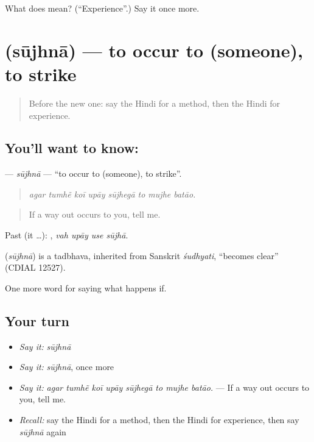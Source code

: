 \begin{tcolorbox}[breakable,colback=teal!4,colframe=teal!35!black,title={Before you move on}]
What does  mean? (\textquotedblleft{}Experience\textquotedblright{}.) Say it once more.
\end{tcolorbox}
\section[\texorpdfstring{\hi{सूझना} (sūjhnā)}{सूझना (sūjhnā)}]{ (sūjhnā) — to occur to (someone), to strike}

\label{lesson:HI-C392-sujhna}



\begin{quote}
Before the new one: say the Hindi for a method, then the Hindi for experience.
\end{quote}

\subsection*{You'll want to know: }
\textbf{} — \emph{sūjhnā} — \textquotedblleft{}to occur to (someone), to strike\textquotedblright{}.

\begin{quote}
       
\end{quote}

\begin{quote}
\emph{agar tumhẽ koī upāy sūjhegā to mujhe batāo.}
\end{quote}

\begin{quote}
If a way out occurs to you, tell me.
\end{quote}

Past (it …):    , \emph{vah upāy use sūjhā}.

\begin{cousinweb}
\textbf{} (\emph{sūjhnā}) is a tadbhava, inherited from Sanskrit \emph{śudhyati}, \textquotedblleft{}becomes clear\textquotedblright{} (CDIAL 12527).
\end{cousinweb}

\begin{grammarlens}[title={What you've built}]
One more word for saying what happens if.
\end{grammarlens}

\subsection*{Your turn}
\begin{itemize}
\raggedright
  \item \emph{Say it:} \emph{sūjhnā}
  \item \emph{Say it:} \emph{sūjhnā}, once more
  \item \emph{Say it:} \emph{agar tumhẽ koī upāy sūjhegā to mujhe batāo.} — If a way out occurs to you, tell me.
  \item \emph{Recall:} say the Hindi for a method, then the Hindi for experience, then say \emph{sūjhnā} again
\end{itemize}

